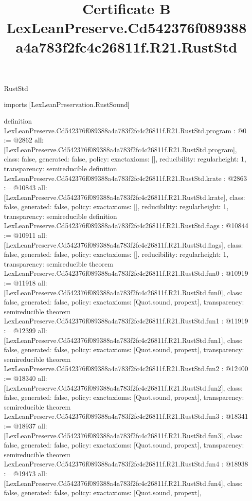 \begin{lexlean}{RustStd}
\title{Certificate B LexLeanPreserve.Cd542376f089388a4a783f2fc4c26811f.R21.RustStd}
\begin{coremodule}
imports [LexLeanPreservation.RustSound]

definition LexLeanPreserve.Cd542376f089388a4a783f2fc4c26811f.R21.RustStd.program : @0 := @2862 {
  all: [LexLeanPreserve.Cd542376f089388a4a783f2fc4c26811f.R21.RustStd.program],
  class: false,
  generated: false,
  policy: exact{axioms: []},
  reducibility: regular{height: 1},
  transparency: semireducible
}
definition LexLeanPreserve.Cd542376f089388a4a783f2fc4c26811f.R21.RustStd.krate : @2863 := @10843 {
  all: [LexLeanPreserve.Cd542376f089388a4a783f2fc4c26811f.R21.RustStd.krate],
  class: false,
  generated: false,
  policy: exact{axioms: []},
  reducibility: regular{height: 1},
  transparency: semireducible
}
definition LexLeanPreserve.Cd542376f089388a4a783f2fc4c26811f.R21.RustStd.flags : @10844 := @10911 {
  all: [LexLeanPreserve.Cd542376f089388a4a783f2fc4c26811f.R21.RustStd.flags],
  class: false,
  generated: false,
  policy: exact{axioms: []},
  reducibility: regular{height: 1},
  transparency: semireducible
}
theorem LexLeanPreserve.Cd542376f089388a4a783f2fc4c26811f.R21.RustStd.fun0 : @10919 := @11918 {
  all: [LexLeanPreserve.Cd542376f089388a4a783f2fc4c26811f.R21.RustStd.fun0],
  class: false,
  generated: false,
  policy: exact{axioms: [Quot.sound, propext]},
  transparency: semireducible
}
theorem LexLeanPreserve.Cd542376f089388a4a783f2fc4c26811f.R21.RustStd.fun1 : @11919 := @12399 {
  all: [LexLeanPreserve.Cd542376f089388a4a783f2fc4c26811f.R21.RustStd.fun1],
  class: false,
  generated: false,
  policy: exact{axioms: [Quot.sound, propext]},
  transparency: semireducible
}
theorem LexLeanPreserve.Cd542376f089388a4a783f2fc4c26811f.R21.RustStd.fun2 : @12400 := @18340 {
  all: [LexLeanPreserve.Cd542376f089388a4a783f2fc4c26811f.R21.RustStd.fun2],
  class: false,
  generated: false,
  policy: exact{axioms: [Quot.sound, propext]},
  transparency: semireducible
}
theorem LexLeanPreserve.Cd542376f089388a4a783f2fc4c26811f.R21.RustStd.fun3 : @18341 := @18937 {
  all: [LexLeanPreserve.Cd542376f089388a4a783f2fc4c26811f.R21.RustStd.fun3],
  class: false,
  generated: false,
  policy: exact{axioms: [Quot.sound, propext]},
  transparency: semireducible
}
theorem LexLeanPreserve.Cd542376f089388a4a783f2fc4c26811f.R21.RustStd.fun4 : @18938 := @19473 {
  all: [LexLeanPreserve.Cd542376f089388a4a783f2fc4c26811f.R21.RustStd.fun4],
  class: false,
  generated: false,
  policy: exact{axioms: [Quot.sound, propext]},
}
\end{coremodule}
\end{lexlean}
